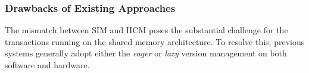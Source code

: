 





\subsubsection{Drawbacks of Existing Approaches}


The mismatch between SIM and HCM poses the substantial challenge for the transactions running on the shared memory architecture. To resolve this, previous systems generally adopt either the \textit{eager} or \textit{lazy} version management on both software and hardware.

